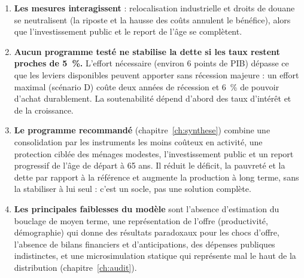 \begin{enumerate}
\item \textbf{Les mesures interagissent} : relocalisation industrielle et droits de douane se neutralisent (la riposte et
la hausse des coûts annulent le bénéfice), alors que l'investissement public et le report de l'âge se complètent.
\item \textbf{Aucun programme testé ne stabilise la dette si les taux restent proches de 5~\%.} L'effort nécessaire
(environ 6 points de PIB) dépasse ce que les leviers disponibles peuvent apporter sans récession majeure : un effort
maximal (scénario D) coûte deux années de récession et 6~\% de pouvoir d'achat durablement. La soutenabilité dépend
d'abord des taux d'intérêt et de la croissance.
\item \textbf{Le programme recommandé} (chapitre~\ref{ch:synthese}) combine une consolidation par les instruments les
moins coûteux en activité, une protection ciblée des ménages modestes, l'investissement public et un report progressif
de l'âge de départ à 65 ans. Il réduit le déficit, la pauvreté et la dette par rapport à la référence et augmente la
production à long terme, sans la stabiliser à lui seul : c'est un socle, pas une solution complète.
\item \textbf{Les principales faiblesses du modèle} sont l'absence d'estimation du bouclage de moyen terme, une
représentation de l'offre (productivité, démographie) qui donne des résultats paradoxaux pour les chocs d'offre,
l'absence de bilans financiers et d'anticipations, des dépenses publiques indistinctes, et une microsimulation statique
qui représente mal le haut de la distribution (chapitre~\ref{ch:audit}).
\end{enumerate}
